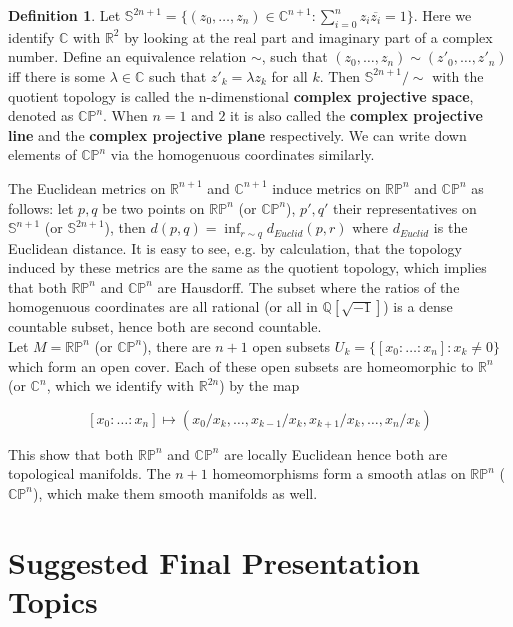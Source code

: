 \documentclass{article}
\theoremstyle{definition}
\newtheorem{dfn}[thm]{Definition}
\begin{document}
\begin{dfn}
    Let $\mathbb{S}^{2n+1}=\{(z_0, \dots, z_n)\in\mathbb{C}^{n+1}: \sum_{i=0}^n z_i\overline{z_i}=1\}$. Here we identify $\mathbb{C}$ with $\mathbb{R}^2$ by looking at the real part and imaginary part of a complex number. Define an equivalence relation $\sim$, such that $(z_0, \dots, z_n)\sim (z'_0, \dots, z'_n)$ iff there is some $\lambda\in\mathbb{C}$ such that $z'_k=\lambda z_k$ for all $k$. Then $\mathbb{S}^{2n+1}/\sim$ with the quotient topology is called the n-dimenstional {\bf complex projective space}, denoted as $\mathbb{CP}^n$. When $n=1$ and $2$ it is also called the {\bf complex projective line} and the {\bf complex projective plane} respectively. We can write down elements of $\mathbb{CP}^n$ via the homogenuous coordinates similarly. 
\end{dfn}
    
The Euclidean metrics on $\mathbb{R}^{n+1}$ and $\mathbb{C}^{n+1}$ induce metrics on $\mathbb{RP}^n$ and $\mathbb{CP}^n$ as follows: let $p, q$ be two points on $\mathbb{RP}^n$ (or $\mathbb{CP}^n$), $p', q'$ their representatives on $\mathbb{S}^{n+1}$ (or $\mathbb{S}^{2n+1}$), then $d(p, q)=\inf_{r\sim q}d_{Euclid}(p, r)$ where $d_{Euclid}$ is the Euclidean distance. It is easy to see, e.g. by calculation, that the topology induced by these metrics are the same as the quotient topology, which implies that both $\mathbb{RP}^n$ and $\mathbb{CP}^n$ are Hausdorff. The subset where the ratios of the homogenuous coordinates are all rational (or all in $\mathbb{Q}[\sqrt{-1}]$) is a dense countable subset, hence both are second countable.\\

Let $M=\mathbb{RP}^n$ (or $\mathbb{CP}^n$), there are $n+1$ open subsets $U_k=\{[x_0:\dots:x_n] : x_k\not=0\}$ which form an open cover. Each of these open subsets are homeomorphic to $\mathbb{R}^n$ (or $\mathbb{C}^n$, which we identify with $\mathbb{R}^{2n}$) by the map

\[[x_0:\dots:x_n]\mapsto (x_0/x_k, \dots, x_{k-1}/x_k, x_{k+1}/x_k, \dots, x_n/x_k)\]

This show that both $\mathbb{RP}^n$ and $\mathbb{CP}^n$ are locally Euclidean hence both are topological manifolds. The $n+1$ homeomorphisms form a smooth atlas on $\mathbb{RP}^n$ ($\mathbb{CP}^n$), which make them smooth manifolds as well.

\newpage

\section{Suggested Final Presentation Topics}
\end{document}
